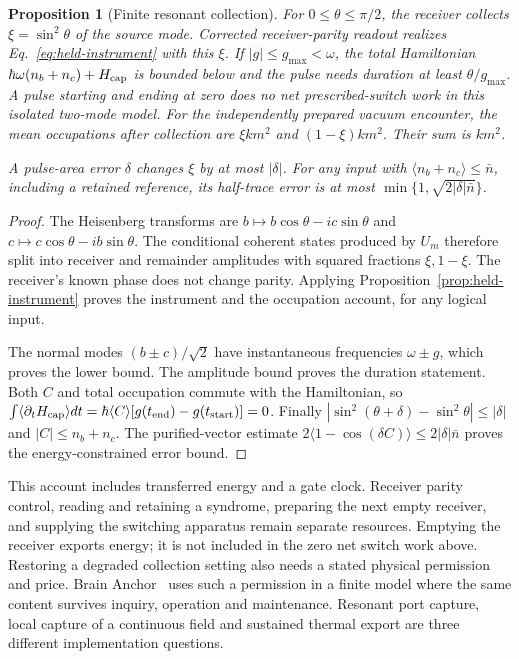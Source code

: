 \documentclass[aps,pre,onecolumn,superscriptaddress,floatfix,longbibliography]{revtex4-2}
\newtheorem{proposition}[theorem]{Proposition}
\begin{document}
\begin{proposition}[Finite resonant collection]
\label{prop:resonant-collection}
For $0\le\theta\le\pi/2$, the receiver collects
$\xi=\sin^2\theta$ of the source mode. Corrected receiver-parity readout
realizes Eq.~\eqref{eq:held-instrument} with this $\xi$.
If $|g|\le g_{\max}<\omega$, the total Hamiltonian
$\hbar\omega(n_b+n_c)+H_{\rm cap}$ is bounded below and the pulse needs
duration at least $\theta/g_{\max}$. A pulse starting and ending at zero
does no net prescribed-switch work in this isolated two-mode model.
For the independently prepared vacuum encounter, the mean occupations after
collection are $\xi km^2$ and $(1-\xi)km^2$. Their sum is $km^2$.

A pulse-area error $\delta$ changes $\xi$ by at most $|\delta|$.
For any input with $\langle n_b+n_c\rangle\le\bar n$, including a
retained reference, its half-trace error is at most
$\min\{1,\sqrt{2|\delta|\bar n}\}$.
\end{proposition}
\begin{proof}
The Heisenberg transforms are
$b\mapsto b\cos\theta-ic\sin\theta$ and
$c\mapsto c\cos\theta-ib\sin\theta$.
The conditional coherent states produced by $U_m$ therefore split into
receiver and remainder amplitudes with squared fractions $\xi,1-\xi$.
The receiver's known phase does not change parity. Applying
Proposition~\ref{prop:held-instrument} proves the instrument and the
occupation account, for any logical input.

The normal modes $(b\pm c)/\sqrt2$ have instantaneous frequencies
$\omega\pm g$, which proves the lower bound. The amplitude bound proves
the duration statement. Both $C$ and total occupation commute with the
Hamiltonian, so
$\int\langle\partial_tH_{\rm cap}\rangle dt
=\hbar\langle C\rangle[g(t_{\rm end})-g(t_{\rm start})]=0$.
Finally $|\sin^2(\theta+\delta)-\sin^2\theta|\le|\delta|$ and
$|C|\le n_b+n_c$. The purified-vector estimate
$2\langle1-\cos(\delta C)\rangle\le2|\delta|\bar n$ proves
the energy-constrained error bound.
\end{proof}

This account includes transferred energy and a gate clock. Receiver parity
control, reading and retaining a syndrome, preparing the next empty receiver,
and supplying the switching apparatus remain separate resources. Emptying the
receiver exports energy; it is not included in the zero net switch work above.
Restoring a degraded collection setting also needs a stated physical permission
and price. Brain Anchor~\cite{Liu2026Brain} uses such a permission in a finite
model where the same content survives inquiry, operation and maintenance.
Resonant port capture, local capture of a continuous field and sustained
thermal export are three different implementation questions.
\end{document}
